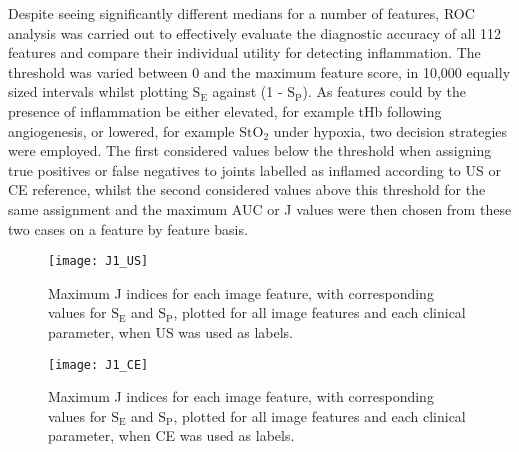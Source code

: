 \documentclass[twoside]{bhamthesis}
\theoremstyle{definition}
\begin{document}
Despite seeing significantly different medians for a number of features, ROC analysis was carried out to effectively evaluate the diagnostic accuracy of all 112 features and compare their individual utility for detecting inflammation. The threshold was varied between 0 and the maximum feature score, in 10,000 equally sized intervals whilst plotting $\mathrm{S_E}$ against (1 - $\mathrm{S_P}$). As features could by the presence of inflammation be either elevated, for example tHb following angiogenesis, or lowered, for example $\mathrm{StO_2}$ under hypoxia, two decision strategies were employed. The first considered values below the threshold when assigning true positives or false negatives to joints labelled as inflamed according to US or CE reference, whilst the second considered values above this threshold for the same assignment and the maximum AUC or J values were then chosen from these two cases on a feature by feature basis.

\begin{figure}[!ht]
\centering\texttt{[image: J1\_US]}\caption{Maximum J indices for each image feature, with corresponding values for $\mathrm{S_E}$ and $\mathrm{S_P}$, plotted for all image features and each clinical parameter, when  US was used as labels.}
\label{fig:J1_US}
\end{figure}

\begin{figure}[!ht]
\centering\texttt{[image: J1\_CE]}\caption{Maximum J indices for each image feature, with corresponding values for $\mathrm{S_E}$ and $\mathrm{S_P}$, plotted for all image features and each clinical parameter, when  CE was used as labels.}
\label{fig:J1_CE}
\end{figure}
\end{document}
